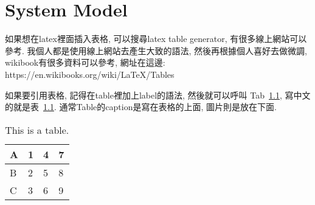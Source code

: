 \chapter{System Model}
\label{ch:architecture}

如果想在latex裡面插入表格, 可以搜尋latex table generator, 有很多線上網站可以參考. 我個人都是使用線上網站去產生大致的語法, 然後再根據個人喜好去做微調, wikibook有很多資料可以參考, 網址在這邊: https://en.wikibooks.org/wiki/LaTeX/Tables

如果要引用表格, 記得在table裡加上label的語法, 然後就可以呼叫 Tab~\ref{tab1}, 寫中文的就是表~\ref{tab1}. 通常Table的caption是寫在表格的上面, 圖片則是放在下面.

\begin{table}[!ht]
    \centering
    \caption{This is a table.}
    \label{tab1}
    \begin{tabular}{|l|l|l|l|}
    \hline
        A & 1 & 4 & 7 \\ \hline
        B & 2 & 5 & 8 \\ \hline
        C & 3 & 6 & 9 \\ \hline
    \end{tabular}
\end{table}
